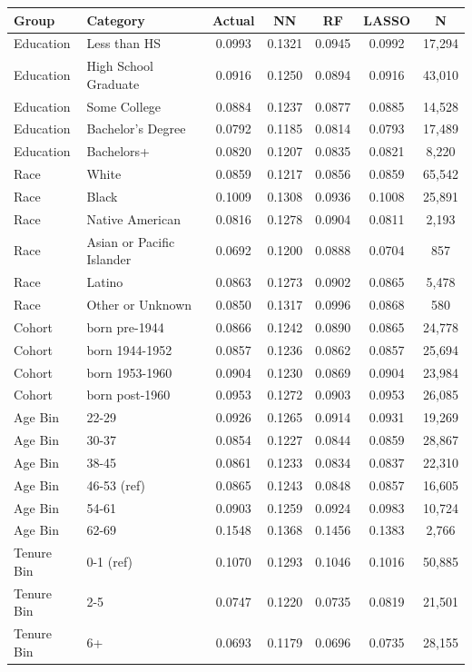 \begin{tabular}{llccccc}
\hline\hline
Group & Category & Actual & NN & RF & LASSO & N \\
\hline
Education&Less than HS&0.0993&0.1321&0.0945&0.0992&17,294\\
Education&High School Graduate&0.0916&0.1250&0.0894&0.0916&43,010\\
Education&Some College&0.0884&0.1237&0.0877&0.0885&14,528\\
Education&Bachelor's Degree&0.0792&0.1185&0.0814&0.0793&17,489\\
Education&Bachelors+&0.0820&0.1207&0.0835&0.0821&8,220\\
Race&White&0.0859&0.1217&0.0856&0.0859&65,542\\
Race&Black&0.1009&0.1308&0.0936&0.1008&25,891\\
Race&Native American&0.0816&0.1278&0.0904&0.0811&2,193\\
Race&Asian or Pacific Islander&0.0692&0.1200&0.0888&0.0704&857\\
Race&Latino&0.0863&0.1273&0.0902&0.0865&5,478\\
Race&Other or Unknown&0.0850&0.1317&0.0996&0.0868&580\\
Cohort&born pre-1944&0.0866&0.1242&0.0890&0.0865&24,778\\
Cohort&born 1944-1952&0.0857&0.1236&0.0862&0.0857&25,694\\
Cohort&born 1953-1960&0.0904&0.1230&0.0869&0.0904&23,984\\
Cohort&born post-1960&0.0953&0.1272&0.0903&0.0953&26,085\\
Age Bin&22-29&0.0926&0.1265&0.0914&0.0931&19,269\\
Age Bin&30-37&0.0854&0.1227&0.0844&0.0859&28,867\\
Age Bin&38-45&0.0861&0.1233&0.0834&0.0837&22,310\\
Age Bin&46-53 (ref)&0.0865&0.1243&0.0848&0.0857&16,605\\
Age Bin&54-61&0.0903&0.1259&0.0924&0.0983&10,724\\
Age Bin&62-69&0.1548&0.1368&0.1456&0.1383&2,766\\
Tenure Bin&0-1 (ref)&0.1070&0.1293&0.1046&0.1016&50,885\\
Tenure Bin&2-5&0.0747&0.1220&0.0735&0.0819&21,501\\
Tenure Bin&6+&0.0693&0.1179&0.0696&0.0735&28,155\\
\hline\hline
\end{tabular}
